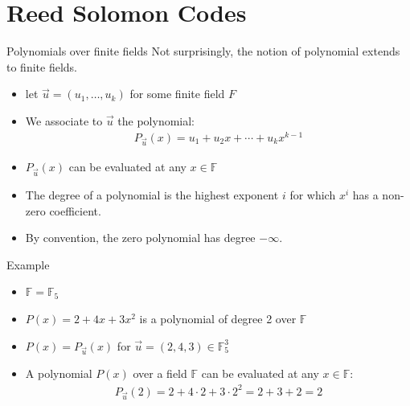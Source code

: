 \section{Reed Solomon Codes}



\begin{parag}{Polynomials over finite fields}
    Not surprisingly, the notion of polynomial extends to finite fields.
    \begin{itemize}
        \item let $\vec{u} =  \left(u_1, \ldots, u_k\right)$ for some finite field $F$
        \item We associate to $\vec{u}$ the polynomial:
           \begin{align*} P_{\vec{u}}\left(x\right) =  u_1 + u_2x + \cdots + u_kx^{k-1}  \end{align*}
       \item $P_{\vec{u}}\left(x\right)$ can be evaluated at any $x \in \mathbb{F}$
       \item The degree of a polynomial is the highest exponent $i$ for which $x^i$ has a non-zero coefficient.
       \item By convention, the zero polynomial has degree $-\infty$.
    \end{itemize}
   \begin{subparag}{Example}
       \begin{itemize}
           \item $\mathbb{F} =  \mathbb{F}_5$ 
           \item $P\left(x\right) =  2 + 4x + 3x^2$ is a polynomial of degree 2 over $\mathbb{F}$
           \item $P\left(x\right) =  P_{\vec{u}}\left(x\right)$ for $\vec{u} = \left(2, 4, 3\right) \in \mathbb{F}_5^3$
           \item A polynomial $P\left(x\right)$ over a field $\mathbb{F}$ can be evaluated at any $x \in \mathbb{F}$:
               \begin{align*} P_{\vec{u}}\left(2\right) = 2 + 4\cdot 2 + 3 \cdot 2^2 = 2 + 3 +  2 = 2\end{align*}
       \end{itemize}  
       
   \end{subparag} 
\end{parag}


